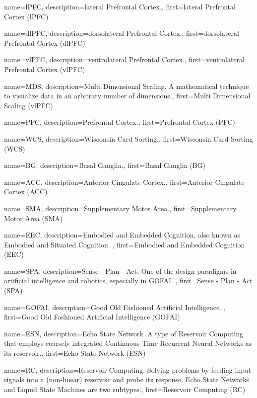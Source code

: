 {
  name=lPFC,
  description={lateral Prefrontal Cortex.},
  first={lateral Prefrontal Cortex (lPFC)}
}

{
  name=dlPFC,
  description={dorsolateral Prefrontal Cortex.},
  first={dorsolateral Prefrontal Cortex (dlPFC)}
}

{
  name=vlPFC,
  description={ventrolateral Prefrontal Cortex.},
  first={ventrolateral Prefrontal Cortex (vlPFC)}
}

{
  name=MDS,
  description={Multi Dimensional Scaling. A mathematical technique to visualize data in an arbitrary number of dimensions.},
  first={Multi Dimensional Scaling (vlPFC)}
}


{
  name=PFC,
  description={Prefrontal Cortex.},
  first={Prefrontal Cortex (PFC)}
}

{
  name=WCS,
  description={Wisconsin Card Sorting.},
  first={Wisconsin Card Sorting (WCS)}
}

{
  name=BG,
  description={Basal Ganglia.},
  first={Basal Ganglia (BG)}
}

{
  name=ACC,
  description={Anterior Cingulate Cortex.},
  first={Anterior Cingulate Cortex (ACC)}
}

{
  name=SMA,
  description={Supplementary Motor Area.},
  first={Supplementary Motor Area (SMA)}
}

{
  name=EEC,
  description={Embodied and Embedded Cognition, also known as Embodied and Situated Cognition. },
  first={Embodied and Embedded Cognition (EEC)}
}

{
  name=SPA,
  description={Sense - Plan - Act. One of the design paradigms in artificial intelligence and robotics, especially in GOFAI. },
  first={Sense - Plan - Act (SPA)}
}

{
  name=GOFAI,
  description={Good Old Fashioned Artificial Intelligence. },
  first={Good Old Fashioned Artificial Intelligence (GOFAI)}
}

{
  name=ESN,
  description={Echo State Network. A type of Reservoir Computing that employs coarsely integrated Continuous Time Recurrent Neural Networks as its reservoir.},
  first={Echo State Network (ESN)}
}

{
  name=RC,
  description={Reservoir Computing. Solving problems by feeding input signals into a (non-linear) reservoir and probe its response. Echo State Networks and Liquid State Machines are two subtypes.},
  first={Reservoir Computing (RC)}
}

